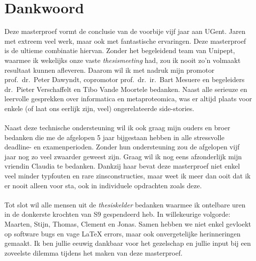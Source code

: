 \chapter*{Dankwoord}\label{ch:dankwoord}
Deze masterproef vormt de conclusie van de voorbije vijf jaar aan UGent.
Jaren met extreem veel werk, maar ook met fantastische ervaringen.
Deze masterproef is de ultieme combinatie hiervan.
Zonder het begeleidend team van Unipept, waarmee ik wekelijks onze vaste \textit{thesismeeting} had, zou ik nooit zo'n volmaakt resultaat kunnen afleveren.
Daarom wil ik met nadruk mijn promotor prof.\ dr.\ Peter Dawyndt, copromotor prof.\ dr.\ ir.\ Bart Mesuere en begeleiders dr.\ Pieter Verschaffelt en Tibo Vande Moortele bedanken.
Naast alle serieuze en leervolle gesprekken over informatica en metaproteomica, was er altijd plaats voor enkele (of laat ons eerlijk zijn, veel) ongerelateerde side-stories.
\\ \\
Naast deze technische ondersteuning wil ik ook graag mijn ouders en broer bedanken die me de afgelopen 5 jaar bijgestaan hebben in alle stressvolle deadline- en examenperioden.
Zonder hun ondersteuning zou de afgelopen vijf jaar nog zo veel zwaarder geweest zijn.
Graag wil ik nog eens afzonderlijk mijn vriendin Claudia te bedanken.
Dankzij haar bevat deze masterproef niet enkel veel minder typfouten en rare zinsconstructies, maar weet ik meer dan ooit dat ik er nooit alleen voor sta, ook in individuele opdrachten zoals deze.
\\ \\
Tot slot wil alle mensen uit de \textit{thesiskelder} bedanken waarmee ik ontelbare uren in de donkerste krochten van S9 gespendeerd heb.
In willekeurige volgorde: Maarten, Stijn, Thomas, Clement en Jonas.
Samen hebben we niet enkel gevloekt op software bugs en vage LaTeX errors, maar ook onvergetelijke herinneringen gemaakt.
Ik ben jullie eeuwig dankbaar voor het gezelschap en jullie input bij een zoveelste dilemma tijdens het maken van deze masterproef.
